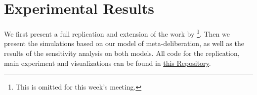 \newpage
\chapter{Experimental Results}
\label{experiment_results}
We first present a full replication and extension of the work by
\citet{radDeliberationSinglePeakednessCoherent2021}\footnote{This is omitted
for this week's meeting.}. Then we present the simulations based on our model of
meta-deliberation, as well as the results of the sensitivity analysis on both
models. All code for the replication, main experiment and visualizations can be
found in \href{https://github.com/amirsahrani/master_thesis}{this Repository}.
%
%
%
